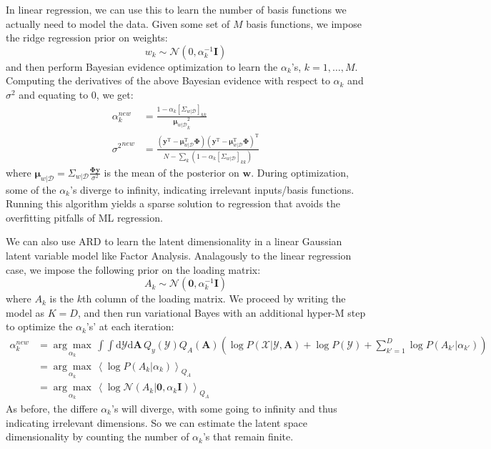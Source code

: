 \documentclass[a4paper]{article}
\begin{document}
In linear regression, we can use this to learn the number of basis functions we actually need to model the data. Given some set of $M$ basis functions, we impose the ridge regression prior on weights:
\[ w_k \sim \mathcal{N}(0,\alpha_k^{-1}\mathbf{I} ) \]
and then perform Bayesian evidence optimization to learn the $\alpha_{k}$'s, $k=1,\ldots,M$. Computing the derivatives of the above Bayesian evidence with respect to $\alpha_k$ and $\sigma^2$ and equating to 0, we get:
\begin{align*}
\alpha_k^{new} &= \frac{1 - \alpha_k\left[\Sigma_{w|\mathcal{D}}\right]_{kk}}{{\mathbf{\mu}_{w|\mathcal{D}}}_k^2} \\
{\sigma^2}^{new} &= \frac{(\mathbf{y}^\textrm{T} - \mathbf{\mu}_{w|\mathcal{D}}^\textrm{T} \mathbf{\Phi}) (\mathbf{y}^\textrm{T} - \mathbf{\mu}_{w|\mathcal{D}}^\textrm{T} \mathbf{\Phi})^\textrm{T}}{N - \sum_k \left(1 - \alpha_k\left[\Sigma_{w|\mathcal{D}}\right]_{kk} \right)}
\end{align*}
where $\mathbf{\mu}_{w|\mathcal{D}} = \Sigma_{w|\mathcal{D}}\frac{\mathbf{\Phi y}}{\sigma^2}$ is the mean of the posterior on $\mathbf{w}$. During optimization, some of the $\alpha_k$'s diverge to infinity, indicating irrelevant inputs/basis functions. Running this algorithm yields a sparse solution to regression that avoids the overfitting pitfalls of ML regression.

We can also use ARD to learn the latent dimensionality in a linear Gaussian latent variable model like Factor Analysis. Analagously to the linear regression case, we impose the following prior on the loading matrix:
\[ A_k \sim \mathcal{N}(\mathbf{0}, \alpha_k^{-1} \mathbf{I}) \]
where $A_k$ is the $k$th column of the loading matrix. We proceed by writing the model as $K=D$, and then run variational Bayes with an additional hyper-M step to optimize the $\alpha_k$'s' at each iteration:
\begin{align*}
\alpha_k^{new} &= \underset{\alpha_k}{\arg\max}\, \int\int \textrm{d}\mathcal{Y} \textrm{d}\mathbf{A} \, Q_y(\mathcal{Y})Q_A(\mathbf{A}) \left( \log P(\mathcal{X}|\mathcal{Y},\mathbf{A}) + \log P(\mathcal{Y}) + \sum_{k'=1}^D \log P(A_{k'}|\alpha_{k'}) \right) \\
&= \underset{\alpha_k}{\arg\max}\, \left\langle \log P(A_k|\alpha_k) \right\rangle_{Q_A} \\
&= \underset{\alpha_k}{\arg\max}\, \left\langle \log \mathcal{N}(A_k|\mathbf{0},\alpha_k \mathbf{I}) \right\rangle_{Q_A}
\end{align*}
As before, the differe $\alpha_k$'s will diverge, with some going to infinity and thus indicating irrelevant dimensions. So we can estimate the latent space dimensionality by counting the number of $\alpha_k$'s that remain finite.
\end{document}
